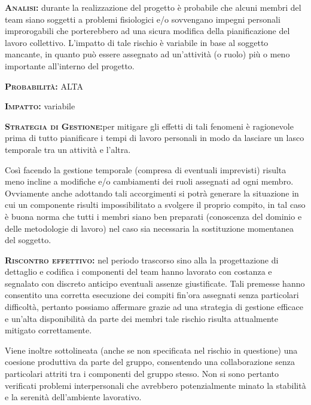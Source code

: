 \begin{description}
	\item{\scshape\bfseries Analisi:} durante la realizzazione del progetto è probabile che alcuni membri del team siano soggetti a problemi fisiologici e/o sovvengano impegni personali improrogabili che porterebbero ad una sicura modifica della pianificazione del lavoro collettivo. L'impatto di tale rischio è variabile in base al soggetto mancante, in quanto può essere assegnato ad un'attività (o ruolo) più o meno importante all'interno del progetto.
	\item{\scshape\bfseries Probabilità:} ALTA
	\item{\scshape\bfseries Impatto:} variabile
	\item{\scshape\bfseries Strategia di Gestione:}per mitigare gli effetti di tali fenomeni è ragionevole prima di tutto pianificare i tempi di lavoro personali in modo da lasciare un lasco temporale tra un attività e l'altra.
	
Così facendo la gestione temporale (compresa di eventuali imprevisti) risulta meno incline a modifiche e/o cambiamenti dei ruoli assegnati ad ogni membro. Ovviamente anche adottando tali accorgimenti si potrà generare la situazione in cui un componente risulti impossibilitato a svolgere il proprio compito, in tal caso è buona norma che tutti i membri siano ben preparati (conoscenza del dominio e delle metodologie di lavoro) nel caso sia necessaria la sostituzione momentanea del soggetto.

	\item{\scshape\bfseries Riscontro effettivo:} nel periodo trascorso sino alla la progettazione di dettaglio e codifica i componenti del team hanno lavorato con costanza e segnalato con discreto anticipo eventuali assenze giustificate. Tali premesse hanno consentito una corretta esecuzione dei compiti fin'ora assegnati senza particolari difficoltà, pertanto possiamo affermare grazie ad una strategia di gestione efficace e un'alta disponibilità da parte dei membri tale rischio risulta attualmente mitigato correttamente.
	
Viene inoltre sottolineata (anche se non specificata nel rischio in questione) una coesione produttiva da parte del gruppo, consentendo una collaborazione senza particolari attriti tra i componenti del gruppo stesso. Non si sono pertanto verificati problemi interpersonali che avrebbero potenzialmente minato la stabilità e la serenità dell'ambiente lavorativo. 
\end{description}

